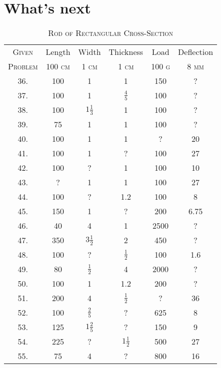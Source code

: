 \documentclass[11pt]{article}
\begin{document}
\section*{What's next}
 


\begin{table}[h!]
    \begin{center}
    \caption{\textsc{Rod of Rectangular Cross-Section}}
    \bgroup
    \def\arraystretch{1.2}%
        \begin{tabular}{c|c|c|c|c|c}
            \hline
            \hline
            \textsc{Given} & Length & Width & Thickness & Load & Deflection \\
            \cline{2-6}
            \textsc{Problem} & 100 \textsc{cm} & 1 \textsc{cm} & 1 \textsc{cm} & 100 \textsc{g} & 8 \textsc{mm} \\
            \hline
            36. & 100 & 1 & 1 & 150 & ? \\
            37. & 100 & 1 & $\frac{4}{5}$ & 100 & ? \\
            38. & 100 & $1\frac{1}{3}$ & 1 & 100 & ? \\
            39. & 75 & 1 & 1 & 100 & ? \\
            40. & 100 & 1 & 1 & ? & 20 \\
            41. & 100 & 1 & ? & 100 & 27 \\
            42. & 100 & ? & 1 & 100 & 10 \\
            43. & ? & 1 & 1 & 100 & 27 \\
            44. & 100 & ? & 1.2 & 100 & 8 \\
            45. & 150 & 1 & ? & 200 & 6.75 \\
            46. & 40 & 4 & 1 & 2500 & ? \\
            47. & 350 & $3\frac{1}{2}$ & 2 & 450 & ? \\
            48. & 100 & ? & $\frac{1}{2}$ & 100 & 1.6 \\
            49. & 80 & $\frac{1}{2}$ & 4 & 2000 & ? \\
            50. & 100 & 1 & 1.2 & 200 & ? \\
            51. & 200 & 4 & $\frac{1}{2}$ & ? & 36 \\
            52. & 100 & $\frac{2}{5}$ & ? & 625 & 8 \\
            53. & 125 & $1\frac{2}{5}$ & ? & 150 & 9 \\
            54. & 225 & ? & $1\frac{1}{2}$ & 500 & 27 \\
            55. & 75 & 4 & ? & 800 & 16 \\
            \hline
            \hline
        \end{tabular}
    \egroup
    \end{center}

\end{table}
\end{document}
